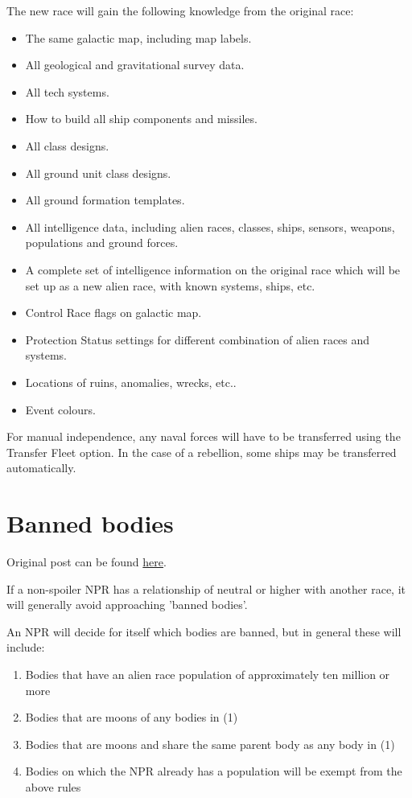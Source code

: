 \documentclass[../Aurora C# unofficial manual.tex]{subfiles}
\begin{document}
	
	The new race will gain the following knowledge from the original race:
	\begin{itemize}
		\item The same galactic map, including map labels.
		\item All geological and gravitational survey data.
		\item All tech systems.
		\item How to build all ship components and missiles.
		\item All class designs.
		\item All ground unit class designs.
		\item All ground formation templates.
		\item All intelligence data, including alien races, classes, ships, sensors, weapons, populations and ground forces.
		\item A complete set of intelligence information on the original race which will be set up as a new alien race, with known systems, ships, etc.
		\item Control Race flags on galactic map.
		\item Protection Status settings for different combination of alien races and systems.
		\item Locations of ruins, anomalies, wrecks, etc..
		\item Event colours.
	\end{itemize}
	
	For manual independence, any naval forces will have to be transferred using the Transfer Fleet option. In the case of a rebellion, some ships may be transferred automatically.
	
	
	\section{Banned bodies}\label{7_banned_bodies}
	Original post can be found
	\href{http://aurora2.pentarch.org/index.php?topic=8495.msg119432#msg119432}{here}.
	\newline\newline
	
	If a non-spoiler NPR has a relationship of neutral or higher with another race, it will generally avoid approaching 'banned bodies'.
	
	An NPR will decide for itself which bodies are banned, but in general these will include:
	\begin{enumerate}
		\item Bodies that have an alien race population of approximately ten million or more
		\item Bodies that are moons of any bodies in (1)
		\item Bodies that are moons and share the same parent body as any body in (1)
		\item Bodies on which the NPR already has a population will be exempt from the above rules
	\end{enumerate}
	
\end{document}
